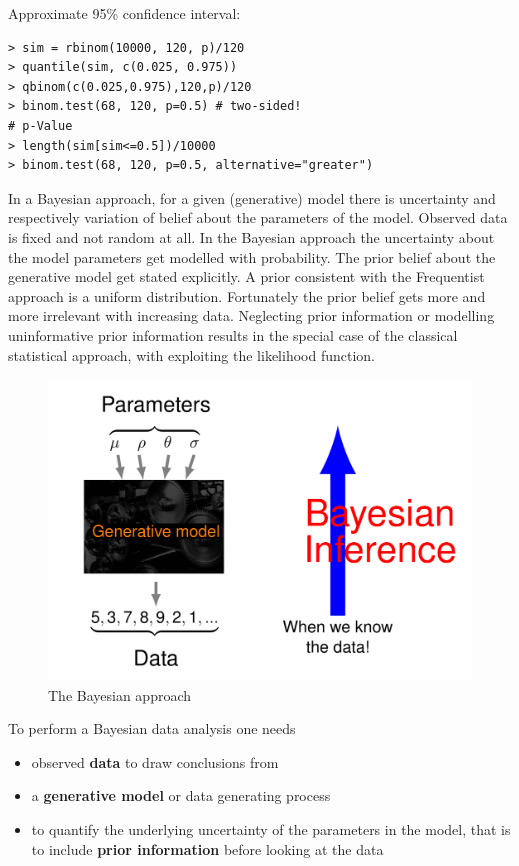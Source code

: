 \documentclass[11pt]{article}
\begin{document}
Approximate 95\% confidence interval:
\begin{verbatim}
> sim = rbinom(10000, 120, p)/120
> quantile(sim, c(0.025, 0.975))
> qbinom(c(0.025,0.975),120,p)/120
> binom.test(68, 120, p=0.5) # two-sided!
# p-Value
> length(sim[sim<=0.5])/10000
> binom.test(68, 120, p=0.5, alternative="greater")
\end{verbatim}

In a Bayesian approach, for a given (generative) model there is uncertainty and respectively variation of belief about the parameters of the model. Observed data is fixed and not random at all. In the Bayesian approach the uncertainty about the model parameters get modelled with probability. The prior belief about the generative model get stated explicitly. A prior consistent with the Frequentist approach is a uniform distribution. Fortunately the prior belief gets more and more irrelevant with increasing data. Neglecting prior information or modelling uninformative prior information results in the special case of the classical statistical approach, with exploiting the likelihood function.

\begin{figure}[tbh]
	\centering
	\includegraphics[width=0.6\linewidth, keepaspectratio]{img/bayesian_approach}
	\caption{The Bayesian approach}
	\label{fig:bayesianapproach}
\end{figure}

\noindent
To perform a Bayesian data analysis one needs
\begin{itemize}
	\item observed \textbf{data} to draw conclusions from
	\item a \textbf{generative model} or data generating process
	\item to quantify the underlying uncertainty of the parameters in the model, that is to include \textbf{prior information} before looking at the data
\end{itemize}
\end{document}
